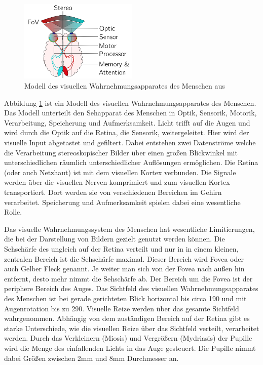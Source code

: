 \begin{figure}
	\centering
	\includegraphics[width=0.5\textwidth]{../../Grafiken/HVS-model_from-star-report.png}
	\caption{Modell des visuellen Wahrnehmungsapparates des Menschen aus \cite{doi:10.1111/cfg.13150}}
	\label{fig:eye01}
\end{figure}

Abbildung \ref{fig:eye01} ist ein Modell des visuellen Wahrnehmungsapparates des Menschen.
Das Modell unterteilt den Sehapparat des Menschen in Optik, Sensorik, Motorik, Verarbeitung, Speicherung und Aufmerksamkeit.
Licht trifft auf die Augen und wird durch die Optik auf die Retina, die Sensorik, weitergeleitet.
Hier wird der visuelle Input abgetastet und gefiltert.
Dabei entstehen zwei Datenströme welche die Verarbeitung stereoskopischer Bilder über einen großen Blickwinkel mit unterschiedlichen räumlich unterschiedlicher Auflösungen ermöglichen.
Die Retina (oder auch Netzhaut) ist mit dem visuellen Kortex verbunden.
Die Signale werden über die visuellen Nerven komprimiert und zum visuellen Kortex transportiert.
Dort werden sie von verschiedenen Bereichen im Gehirn verarbeitet.
Speicherung und Aufmerksamkeit spielen dabei eine wesentliche Rolle.

Das visuelle Wahrnehmungssystem des Menschen hat wesentliche Limitierungen, die bei der Darstellung von Bildern gezielt genutzt werden können.
Die Sehschärfe des ungleich auf der Retina verteilt und nur in in einem kleinen, zentralen Bereich ist die Sehschärfe maximal.
Dieser Bereich wird Fovea oder auch Gelber Fleck genannt.
Je weiter man sich von der Fovea nach außen hin entfernt, desto mehr nimmt die Sehschärfe ab.
Der Bereich um die Fovea ist der periphere Bereich des Auges.
Das Sichtfeld des visuellen Wahrnehmungsapparates des Menschen ist bei gerade gerichteten Blick horizontal bis circa 190\textdegree{} und mit Augenrotation bis zu 290\textdegree{}.
Visuelle Reize werden über das gesamte Sichtfeld wahrgenommen.
Abhängig von dem zuständigen Bereich auf der Retina gibt es starke Unterschiede, wie die visuellen Reize über das Sichtfeld verteilt, verarbeitet werden.
Durch das Verkleinern (Miosis) und Vergrößern (Mydriasis) der Pupille wird die Menge des einfallenden Lichts in das Auge gesteuert.
Die Pupille nimmt dabei Größen zwischen 2mm und 8mm Durchmesser an.

